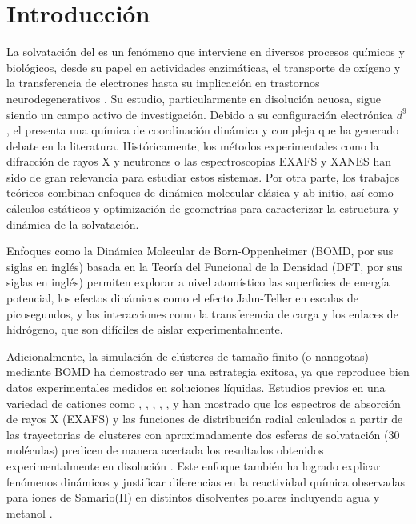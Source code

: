 \chapter{Introducción}

La solvatación del  es un fenómeno que interviene en diversos procesos químicos y biológicos, desde su papel en actividades enzimáticas, el transporte de oxígeno y la transferencia de electrones \cite{Wa-2023-01, Wa-2024-03} hasta su implicación en trastornos neurodegenerativos \cite{Cu-2014-02}. 
Su estudio, particularmente en disolución acuosa, sigue siendo un campo activo de investigación. Debido a su configuración electrónica $d^9$, el  presenta una química de coordinación dinámica y compleja que ha generado debate en la literatura. Históricamente, los métodos experimentales como la difracción de rayos X y neutrones o las espectroscopias EXAFS y XANES han sido de gran relevancia para estudiar estos sistemas. Por otra parte, los trabajos teóricos combinan enfoques de dinámica molecular clásica y ab initio, así como cálculos estáticos y optimización de geometrías para caracterizar la estructura y dinámica de la solvatación.

Enfoques como la Dinámica Molecular de Born-Oppenheimer (BOMD, por sus siglas en inglés) basada en la Teoría del Funcional de la Densidad (DFT, por sus siglas en inglés) permiten explorar a nivel atomístico las superficies de energía potencial, los efectos dinámicos como el efecto Jahn-Teller en escalas de picosegundos, y las interacciones como la transferencia de carga y los enlaces de hidrógeno, que son difíciles de aislar experimentalmente. 

Adicionalmente, la simulación de clústeres de tamaño finito (o nanogotas) mediante BOMD ha demostrado ser una estrategia exitosa, ya que reproduce bien datos experimentales medidos en soluciones líquidas. Estudios previos en una variedad de cationes como , , , , ,  y  han mostrado que los espectros de absorción de rayos X (EXAFS) y las funciones de distribución radial calculados a partir de las trayectorias de clusteres con aproximadamente dos esferas de solvatación (30 moléculas) predicen de manera acertada los resultados obtenidos experimentalmente en disolución \cite{CILP-2018-02, CILP-2019-01, CILP-2023-01, CILP-2024-01}. Este enfoque también ha logrado explicar fenómenos dinámicos y justificar diferencias en la reactividad química observadas para iones de Samario(II) en distintos disolventes polares incluyendo agua y metanol \cite{CILP-2020-01, CILP-2021-02}. 

